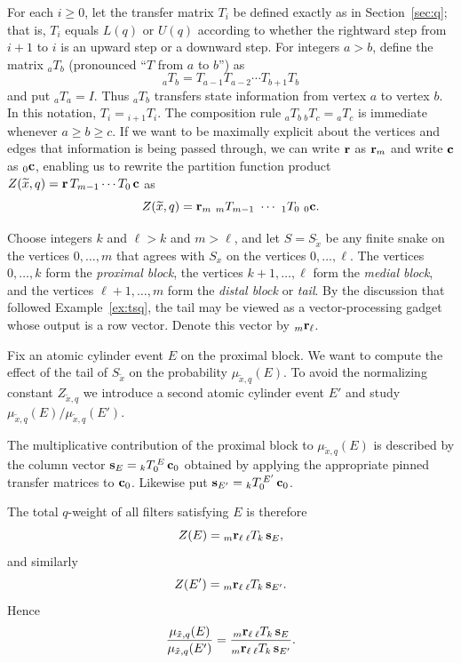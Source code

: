 \documentclass[12pt]{article}
\theoremstyle{plain}
\theoremstyle{definition}
\theoremstyle{remark}
\begin{document}
For each $i \ge 0$, let the transfer matrix $T_i$ be defined 
exactly as in Section~\ref{sec:q}; that is, $T_i$ equals $L(q)$ or $U(q)$ 
according to whether the rightward step 
from $i+1$ to $i$ is an upward step or a downward step.
For integers $a > b$, define the matrix ${}_aT_b$
(pronounced ``$T$ from $a$ to $b$'') as
\[ {}_aT_b = T_{a-1}T_{a-2}\cdots T_{b+1}T_b \]
and put ${}_aT_a=I$. Thus ${}_aT_b$
transfers state information from vertex $a$ to vertex $b$.
In this notation, $T_i = {}_{i+1}T_i$.
The composition rule ${}_aT_b\,{}_bT_c = {}_aT_c$
is immediate whenever $a \ge b \ge c$.
If we want to be maximally explicit
about the vertices and edges that information is being passed through,
we can write ${\bf r}$ as ${\bf r}_m$ 
and write ${\bf c}$ as ${}_0 {\bf c}$,
enabling us to rewrite the partition function product 
$Z(\widetilde{x},q) = {\bf r} \, T_{m-1} \cdots T_0 \, {\bf c}$ as 
$$Z(\widetilde{x},q) = {\bf r}_m \  {}_{m} T_{m-1} \  \cdots 
\  {}_1 T_0 \  {}_0 {\bf c}.$$

Choose integers $k$ and $\ell>k$ and $m>\ell$,
and let $S=S_{\widetilde{x}}$ be any finite snake on the vertices
$0,\dots,m$ that agrees with $S_x$ on the vertices $0,\dots,\ell$.
The vertices $0,\dots,k$ form the {\em proximal block},
the vertices $k+1,\dots,\ell$ form the {\em medial block},
and the vertices $\ell+1,\dots,m$ form the {\em distal block} or {\em tail}.
By the discussion that followed Example~\ref{ex:tsq},
the tail may be viewed as a vector-processing gadget
whose output is a row vector.
Denote this vector by ${}_m{\bf r}_{\ell}$.

Fix an atomic cylinder event $E$ on the proximal block.
We want to compute the effect of the tail of $S_{\tilde{x}}$
on the probability $\mu_{\tilde{x},q}(E)$.
To avoid the normalizing constant $Z_{\tilde{x},q}$
we introduce a second atomic cylinder event $E'$
and study $\mu_{\tilde{x},q}(E)/\mu_{\tilde{x},q}(E')$.

The multiplicative contribution of the proximal block
to $\mu_{\tilde{x},q}(E)$ is described by the column vector
$ {\bf s}_E = {}_kT_0^{\,E}\,{\bf c}_0 $
obtained by applying the appropriate
pinned transfer matrices to ${\bf c}_0$.
Likewise put $ {\bf s}_{E'} = {}_kT_0^{\,E'}\,{\bf c}_0 $.

The total $q$-weight of all filters satisfying $E$ is therefore
\[ Z(E) = {}_m{\bf r}_{\ell}\, {}_{\ell}T_k\, {\bf s}_E, \]
and similarly
\[ Z(E') = {}_m{\bf r}_{\ell}\, {}_{\ell}T_k\, {\bf s}_{E'}. \]
Hence
\[ \frac{\mu_{\tilde{x},q}(E)} {\mu_{\tilde{x},q}(E')} =
\frac{ {}_m{\bf r}_{\ell}\, {}_{\ell}T_k\, {\bf s}_E }
{ {}_m{\bf r}_{\ell}\, {}_{\ell}T_k\, {\bf s}_{E'} }.  \]
\end{document}
